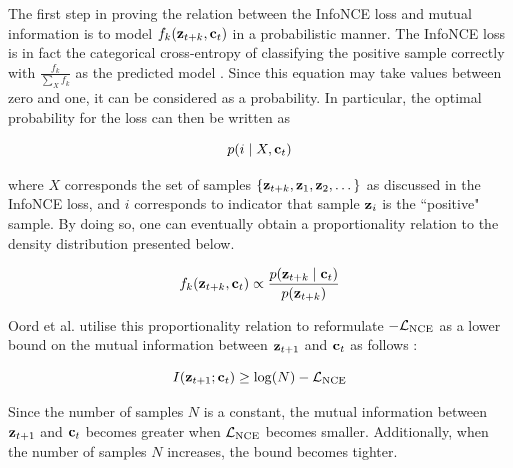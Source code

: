 	The first step in proving the relation between the InfoNCE loss and mutual information is to model $f_k(\mathbf{z}_{t+k}, \mathbf{c}_t)$ in a probabilistic manner. The InfoNCE loss is in fact the categorical cross-entropy of classifying the positive sample correctly with $\frac{f_k}{\sum_{X} f_k}$ as the predicted model \citep{oordRepresentationLearningContrastive2019}. Since this equation may take values between zero and one, it can be considered as a probability. In particular, the optimal probability for the loss can then be written as 

	$$p(i \mid X, \mathbf{c}_t)$$
	
	where $X$ corresponds the set of samples  ${ \left\{ \mathbf{z}_{t+k}, \mathbf{z}_1, \mathbf{z}_2, \dots \right\} }$  as discussed in the InfoNCE loss, and $i$ corresponds to indicator that sample $\mathbf{z}_i$ is the ``positive" sample. By doing so, one can eventually obtain a proportionality relation to the density distribution presented below. 
	
	\begin{equation}
		f_k(\mathbf{z}_{t+k}, \mathbf{c}_t) \propto \frac{p(\mathbf{z}_{t+k} \mid \mathbf{c}_t)}{p(\mathbf{z}_{t+k})} \label{eq:fkproporational}
	\end{equation}
	
	Oord et al. utilise this proportionality relation to reformulate $-\mathcal{L}_{\text{NCE}}$ as a lower bound on the mutual information between $\mathbf{z}_{t+1}$ and $\mathbf{c}_t$ as follows \citep{lowePuttingEndEndtoEnd2020, oordRepresentationLearningContrastive2019}:
	
	\begin{equation}
		I(\mathbf{z}_{t+1}; \mathbf{c}_t) \ge \log(N) - \mathcal{L}_{\text{NCE}}
	\end{equation}

	Since the number of samples $N$ is a constant, the mutual information between $\mathbf{z}_{t+1}$ and $\mathbf{c}_t$ becomes greater when $\mathcal{L}_{\text{NCE}}$ becomes smaller. Additionally, when the number of samples $N$ increases, the bound becomes tighter.
	
			
	
	

